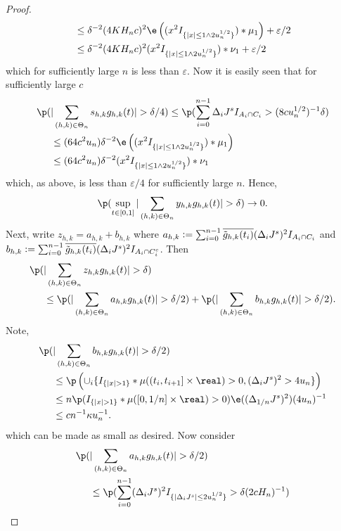 \begin{proof}
\begin{align}
&\le \delta^{-2} (4K H_nc)^{2}\e\left( (x^2I_{\{\vert x\vert \le 1 \wedge 2 u_n^{1/2}\}})\ast\mu_1  \right) + \varepsilon/2\notag\\
&\le \delta^{-2} (4K H_nc)^{2} (x^2I_{\{\vert x\vert \le 1 \wedge 2 u_n^{1/2}\}})\ast\nu_1   + \varepsilon/2\notag
  \label{}
\end{align}
which for sufficiently large $n$ is  less than $\varepsilon$.
Now it is easily seen that for sufficiently large $c$
\begin{align}
  \p(&\vert \sumt s_{h,k} \ghk(t) \vert > \delta/4) \le \p( \sumin  \djt I_{A_i \cap C_i} > (8 c u_n^{1/2})^{-1}\delta) \notag\\
  &\le (64 c^2 u_n)\delta^{-2} \e\left( (x^2I_{\{\vert x\vert \le 1 \wedge 2 u_n^{1/2}\}})\ast\mu_1  \right)\notag \\
  & \le  (64 c^2 u_n)\delta^{-2} (x^2I_{\{\vert x\vert \le 1 \wedge 2 u_n^{1/2}\}})\ast\nu_1
  \label{}
\end{align}
which, as above, is  less than $\varepsilon/4$ for sufficiently large $n$.
Hence, 
\begin{align}
  \notag
  \p(\sup_{t \in [0,1]}\vert \sumt y_{h,k} \ghk(t) \vert > \delta) \to 0.\label{eq:y}
\end{align}
Next,  write $z_{h,k} = a_{h,k} + b_{h,k}$ where $a_{h,k} :=  \sum_{i = 0}^{n-1} \overline{\tilde{g}_{h,k}(t_i)}(\Delta_i J^s)^2I_{A_i \cap C_i}$ and  $b_{h,k} := \sum_{i = 0}^{n-1} \overline{\tilde{g}_{h,k}(t_i)}(\Delta_i J^s)^2I_{A_i \cap C_i^c}$. Then 
\begin{align}
  \p(&\vert \sumt z_{h,k} \ghk(t) \vert   > \delta) \notag \\ &\le \p(\vert \sumt a_{h,k} \ghk(t) \vert > \delta/2) + \p(\vert \sumt b_{h,k} \ghk(t) \vert > \delta/2)\notag.
\end{align}
Note,
\begin{align}
  \p(&\vert \sumt b_{h,k} \ghk(t) \vert > \delta/2) \notag \\ &\le
\p\left(\cup_i\{I_{\{\vert x \vert > 1\}}\ast \mu( (t_i, t_{i + 1}] \times \real) > 0   , (\djt)^2 > 4u_n\}\right) \notag \\
&\le n \p(I_{\{\vert x \vert > 1\}}\ast \mu( [0, 1/n] \times \real) > 0) \e((\Delta_{1/n} J^s)^2)(4u_n)^{-1}\notag \\
&\le cn^{-1}\kappa  u^{-1}_n.
\end{align}
which can be made as small as desired. Now consider
\begin{align}
  \p(&\vert \sumt a_{h,k} \ghk(t) \vert > \delta/2) \notag \\ &\le \p( \sumin (\djt)^2 I_{\{\vert \djt \vert \le 2u_n^{1/2} \}} > \delta (2 c H_n)^{-1} )\notag\\

\end{align}
\end{proof}
